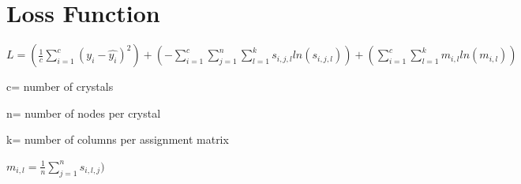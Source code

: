 \documentclass{article}
\begin{document}
\section{Loss Function}

$L = (\frac{1}{c} \sum_{i=1}^{c} (y_i - \hat{y_i})^2 ) + (-\sum_{i=1}^{c} \sum_{j=1}^{n} \sum_{l=1}^{k} s_{i,j,l} ln(s_{i,j,l})) +(\sum_{i=1}^{c} \sum_{l=1}^{k} m_{i,l} ln(m_{i,l})) $


c= number of crystals

n= number of nodes per crystal

k= number of columns per assignment matrix

$m_{i,l}=\frac{1}{n}\sum_{j=1}^{n} s_{i,l,j}) $
\end{document}
